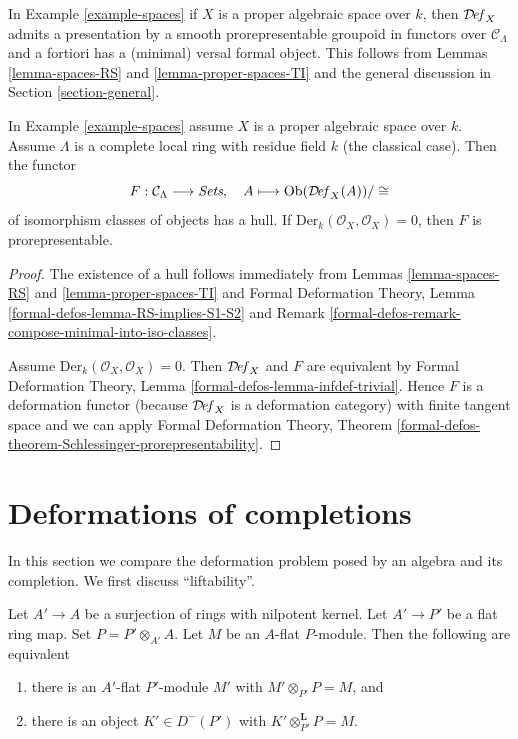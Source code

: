 \noindent
In Example \ref{example-spaces} if $X$ is a proper algebraic space over $k$,
then $\mathcal{D}\!\mathit{ef}_X$
admits a presentation by a smooth prorepresentable groupoid in functors
over $\mathcal{C}_\Lambda$
and a fortiori has a (minimal) versal formal object. This follows
from Lemmas \ref{lemma-spaces-RS} and
\ref{lemma-proper-spaces-TI}
and the general discussion in Section \ref{section-general}.

\begin{lemma}
\label{lemma-spaces-hull}
In Example \ref{example-spaces} assume $X$ is a proper algebraic space over $k$.
Assume $\Lambda$ is a complete local ring with residue field $k$
(the classical case). Then the functor
$$
F : \mathcal{C}_\Lambda \longrightarrow \textit{Sets},\quad
A \longmapsto \mathop{\mathrm{Ob}}\nolimits(\mathcal{D}\!\mathit{ef}_X(A))/\cong
$$
of isomorphism classes of objects has a hull. If
$\text{Der}_k(\mathcal{O}_X, \mathcal{O}_X) = 0$, then
$F$ is prorepresentable.
\end{lemma}

\begin{proof}
The existence of a hull follows immediately from
Lemmas \ref{lemma-spaces-RS} and \ref{lemma-proper-spaces-TI} and
Formal Deformation Theory, Lemma \ref{formal-defos-lemma-RS-implies-S1-S2}
and Remark \ref{formal-defos-remark-compose-minimal-into-iso-classes}.

\medskip\noindent
Assume $\text{Der}_k(\mathcal{O}_X, \mathcal{O}_X) = 0$. Then
$\mathcal{D}\!\mathit{ef}_X$ and $F$ are equivalent by
Formal Deformation Theory, Lemma \ref{formal-defos-lemma-infdef-trivial}.
Hence $F$ is a deformation functor (because $\mathcal{D}\!\mathit{ef}_X$ is a
deformation category) with finite tangent space and we can apply
Formal Deformation Theory, Theorem
\ref{formal-defos-theorem-Schlessinger-prorepresentability}.
\end{proof}





\section{Deformations of completions}
\label{section-compare}

\noindent
In this section we compare the deformation problem posed
by an algebra and its completion.
We first discuss ``liftability''.

\begin{lemma}
\label{lemma-lift-equivalence-module-derived}
Let $A' \to A$ be a surjection of rings with nilpotent kernel.
Let $A' \to P'$ be a flat ring map.
Set $P = P' \otimes_{A'} A$.
Let $M$ be an $A$-flat $P$-module.
Then the following are equivalent
\begin{enumerate}
\item there is an $A'$-flat $P'$-module $M'$ with
$M' \otimes_{P'} P = M$, and
\item there is an object $K' \in D^-(P')$ with
$K' \otimes_{P'}^\mathbf{L} P = M$.
\end{enumerate}
\end{lemma}

